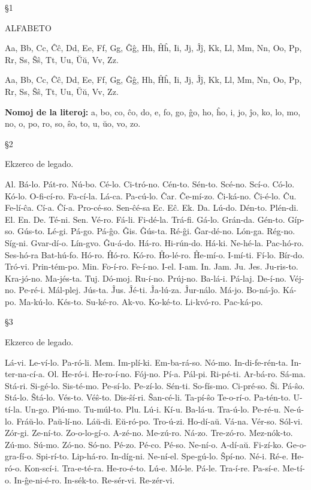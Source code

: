 %
%
\label{ekzercaro}
\thispagestyle{plain}
\begin{center}

\end{center}

§1

ALFABETO

Aa, Bb, Cc, Ĉĉ, Dd, Ee, Ff, Gg, Ĝĝ, Hh, Ĥĥ, Ii, Jj, Ĵĵ, Kk, Ll, Mm, Nn, Oo, Pp, Rr, Ss, Ŝŝ, Tt, Uu, Ŭŭ, Vv, Zz.

Aa, Bb, Cc, Ĉĉ, Dd, Ee, Ff, Gg, Ĝĝ, Hh, Ĥĥ, Ii, Jj, Ĵĵ, Kk, Ll, Mm, Nn, Oo, Pp, Rr, Ss, Ŝŝ, Tt, Uu, Ŭŭ, Vv, Zz.

\textbf{Nomoj de la literoj:} a, bo, co, ĉo, do, e, fo, go, ĝo, ho, ĥo, i, jo, ĵo, ko, lo, mo, no, o, po, ro, so, ŝo, to, u, ŭo, vo, zo.

§2

Ekzerco de legado.

Al. Bá-lo. Pát-ro. Nú-bo. Cé-lo. Ci-tró-no. Cén-to. Sén-to. Scé-no. Scí-o. Có-lo. Kó-lo. O-fi-cí-ro. Fa-cí-la. Lá-ca. Pa-cú-lo. Ĉar. Ĉe-mí-zo. Ĉi-ká-no. Ĉi-é-lo. Ĉu. Fe-lí-ĉa. Cí-a. Ĉí-a. Pro-cé-so. Sen-ĉé-sa Ec. Eĉ. Ek. Da. Lú-do. Dén-to. Plén-di. El. En. De. Té-ni. Sen. Vé-ro. Fá-li. Fi-dé-la. Trá-fi. Gá-lo. Grán-da. Gén-to. Gíp-so. Gús-to. Lé-gi. Pá-go. Pá-ĝo. Ĝis. Ĝús-ta. Ré-ĝi. Ĝar-dé-no. Lón-ga. Rég-no. Síg-ni. Gvar-dí-o. Lín-gvo. Ĝu-á-do. Há-ro. Hi-rún-do. Há-ki. Ne-hé-la. Pac-hó-ro. Ses-hó-ra Bat-hú-fo. Hó-ro. Ĥó-ro. Kó-ro. Ĥo-lé-ro. Ĥe-mí-o. I-mí-ti. Fí-lo. Bír-do. Tró-vi. Prin-tém-po. Min. Fo-í-ro. Fe-í-no. I-el. I-am. In. Jam. Ju. Jes. Ju-ris-to. Kra-jó-no. Ma-jés-ta. Tuj. Dó-moj. Ru-í-no. Prúj-no. Ba-lá-i. Pá-laj. De-í-no. Véj-no. Pe-ré-i. Mál-plej. Jús-ta. Ĵus. Ĵé-ti. Ĵa-lú-za. Ĵur-nálo. Má-jo. Bo-ná-ĵo. Ká-po. Ma-kú-lo. Kés-to. Su-ké-ro. Ak-vo. Ko-ké-to. Li-kvó-ro. Pac-ká-po.

§3

Ekzerco de legado.

Lá-vi. Le-ví-lo. Pa-ró-li. Mem. Im-plí-ki. Em-ba-rá-so. Nó-mo. In-di-fe-rén-ta. In-ter-na-cí-a. Ol. He-ró-i. He-ro-í-no. Fój-no. Pí-a. Pál-pi. Ri-pé-ti. Ar-bá-ro. Sá-ma. Stá-ri. Si-gé-lo. Sis-té-mo. Pe-sí-lo. Pe-zí-lo. Sén-ti. So-fís-mo. Ci-pré-so. Ŝi. Pá-ŝo. Stá-lo. Ŝtá-lo. Vés-to. Véŝ-to. Dis-ŝí-ri. Ŝan-cé-li. Ta-pí-ŝo Te-o-rí-o. Pa-tén-to. U-tí-la. Un-go. Plú-mo. Tu-múl-to. Plu. Lú-i. Kí-u. Ba-lá-u. Tra-ú-lo. Pe-ré-u. Ne-ú-lo. Fráŭ-lo. Paŭ-lí-no. Láŭ-di. Eŭ-ró-po. Tro-ú-zi. Ho-dí-aŭ. Vá-na. Vér-so. Sól-vi. Zór-gi. Ze-ní-to. Zo-o-lo-gí-o. A-zé-no. Me-zú-ro. Ná-zo. Tre-zó-ro. Mez-nók-to. Zú-mo. Sú-mo. Zó-no. Só-no. Pé-zo. Pé-co. Pé-so. Ne-ní-o. A-dí-aŭ. Fi-zí-ko. Ge-o-gra-fí-o. Spi-rí-to. Lip-há-ro. In-díg-ni. Ne-ní-el. Spe-gú-lo. Ŝpí-no. Né-i. Ré-e. He-ró-o. Kon-scí-i. Tra-e-té-ra. He-ro-é-to. Lú-e. Mó-le. Pá-le. Tra-í-re. Pa-sí-e. Me-tí-o. In-ĝe-ni-é-ro. In-sék-to. Re-sér-vi. Re-zér-vi.

